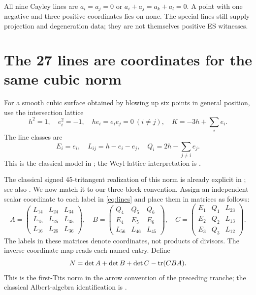 \documentclass[11pt]{article}
\theoremstyle{remark}\newtheorem{remark}[theorem]{Remark}
\begin{document}
All nine Cayley lines are $a_i=a_j=0$ or $a_i+a_j=a_k+a_l=0$. A point with one negative and three positive coordinates lies on none. The special lines still supply projection and degeneration data; they are not themselves positive ES witnesses.

\section{The 27 lines are coordinates for the same cubic norm}
For a smooth cubic surface obtained by blowing up six points in general position, use the intersection lattice
\[
 h^2=1,\quad e_i^2=-1,\quad h e_i=e_ie_j=0\ (i\ne j),\quad
 K=-3h+\sum_i e_i.
\]
The line classes are
\begin{equation}\label{eq:lines}
 E_i=e_i,\quad L_{ij}=h-e_i-e_j,\quad
 Q_i=2h-\sum_{j\ne i}e_j.
\end{equation}
This is the classical model in \citet[\S2.1, pp.~4--5]{medrano}; the Weyl-lattice interpretation is \citet[\S1, Theorem~1 and following remark]{bayerserre}.

The classical signed 45-tritangent realization of this norm is already explicit in \citet[Remark~3.4, pp.~11--12 of the preprint]{kimschreyer}; see also \citet[\S3.1, p.~8]{ilievmanivel}. We now match it to our three-block convention. Assign an independent scalar coordinate to each label in \eqref{eq:lines} and place them in matrices as follows:
\begin{equation}\label{eq:blocks}
 A=\begin{pmatrix}L_{14}&L_{24}&L_{34}\\L_{15}&L_{25}&L_{35}\\L_{16}&L_{26}&L_{36}\end{pmatrix},\quad
 B=\begin{pmatrix}Q_4&Q_5&Q_6\\E_4&E_5&E_6\\L_{56}&L_{46}&L_{45}\end{pmatrix},\quad
 C=\begin{pmatrix}E_1&Q_1&L_{23}\\E_2&Q_2&L_{13}\\E_3&Q_3&L_{12}\end{pmatrix}.
\end{equation}
The labels in these matrices denote coordinates, not products of divisors. The inverse coordinate map reads each named entry. Define
\begin{equation}\label{eq:Tits}
 N=\det A+\det B+\det C-\operatorname{tr}(CBA).
\end{equation}
This is the first-Tits norm in the arrow convention of the preceding tranche; the classical Albert-algebra identification is \citet[\S5, Theorem~11 and Appendix~A]{baezpumplun}.
\end{document}
